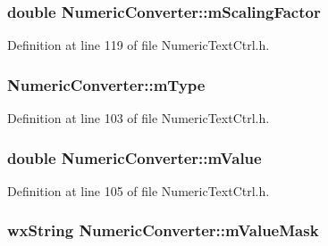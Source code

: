 \subsubsection[{\texorpdfstring{m\+Scaling\+Factor}{mScalingFactor}}]{\setlength{\rightskip}{0pt plus 5cm}double Numeric\+Converter\+::m\+Scaling\+Factor\hspace{0.3cm}{\ttfamily [protected]}}\hypertarget{class_numeric_converter_aa7fb7f340cd65b16eabc8c998900d34f}{}\label{class_numeric_converter_aa7fb7f340cd65b16eabc8c998900d34f}


Definition at line 119 of file Numeric\+Text\+Ctrl.\+h.

\subsubsection[{\texorpdfstring{m\+Type}{mType}}]{ Numeric\+Converter\+::m\+Type\hspace{0.3cm}{\ttfamily [protected]}}\hypertarget{class_numeric_converter_aff1bfcbfd6002c1176f57d907c49ae4b}{}\label{class_numeric_converter_aff1bfcbfd6002c1176f57d907c49ae4b}


Definition at line 103 of file Numeric\+Text\+Ctrl.\+h.

\subsubsection[{\texorpdfstring{m\+Value}{mValue}}]{\setlength{\rightskip}{0pt plus 5cm}double Numeric\+Converter\+::m\+Value\hspace{0.3cm}{\ttfamily [protected]}}\hypertarget{class_numeric_converter_a76d02fd3753f469f97d696011a7006eb}{}\label{class_numeric_converter_a76d02fd3753f469f97d696011a7006eb}


Definition at line 105 of file Numeric\+Text\+Ctrl.\+h.

\subsubsection[{\texorpdfstring{m\+Value\+Mask}{mValueMask}}]{\setlength{\rightskip}{0pt plus 5cm}wx\+String Numeric\+Converter\+::m\+Value\+Mask\hspace{0.3cm}{\ttfamily [protected]}}\hypertarget{class_numeric_converter_a4a1e3563294fc2813e56c5a4b3403ee7}{}\label{class_numeric_converter_a4a1e3563294fc2813e56c5a4b3403ee7}


